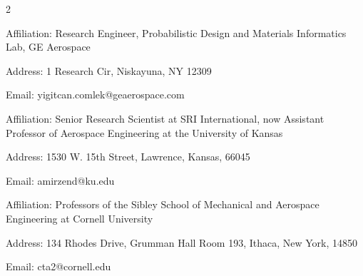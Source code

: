 \begin{multicols}{2}
\vspace{10pt}
\begin{cvitems}
\paragraphstyle
\item Affiliation: Research Engineer, Probabilistic Design and Materials Informatics Lab, GE Aerospace
\item Address: 1 Research Cir, Niskayuna, NY 12309
\item Email: yigitcan.comlek@geaerospace.com
\end{cvitems}
\vspace{15pt}


\vspace{10pt}
\begin{cvitems}
\paragraphstyle
\item Affiliation: Senior Research Scientist at SRI International, now Assistant Professor of Aerospace Engineering at the University of Kansas
\item Address: 1530 W. 15th Street, Lawrence, Kansas, 66045
\item Email: amirzend@ku.edu
\end{cvitems}
\vspace{31pt}


\vspace{5pt}
\begin{cvitems}
\paragraphstyle
\item Affiliation: Professors of the Sibley School of Mechanical and Aerospace Engineering at Cornell University

\item Address: 134 Rhodes Drive, Grumman Hall Room 193, Ithaca, New York, 14850
\item Email: cta2@cornell.edu
\end{cvitems}
\vspace{10pt}

\end{multicols}









